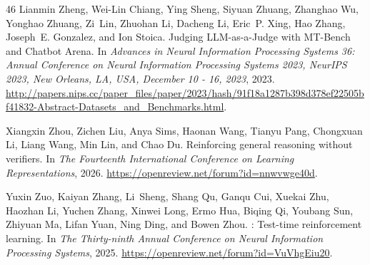 \begin{thebibliography}{46}
Lianmin Zheng, Wei{-}Lin Chiang, Ying Sheng, Siyuan Zhuang, Zhanghao Wu, Yonghao Zhuang, Zi~Lin, Zhuohan Li, Dacheng Li, Eric~P. Xing, Hao Zhang, Joseph~E. Gonzalez, and Ion Stoica.
\newblock Judging {LLM-as-a-Judge} with {MT-Bench} and {Chatbot Arena}.
\newblock In \emph{Advances in Neural Information Processing Systems 36: Annual Conference on Neural Information Processing Systems 2023, NeurIPS 2023, New Orleans, LA, USA, December 10 - 16, 2023}, 2023.
\newblock \url{http://papers.nips.cc/paper\_files/paper/2023/hash/91f18a1287b398d378ef22505bf41832-Abstract-Datasets\_and\_Benchmarks.html}.

Xiangxin Zhou, Zichen Liu, Anya Sims, Haonan Wang, Tianyu Pang, Chongxuan Li, Liang Wang, Min Lin, and Chao Du.
\newblock Reinforcing general reasoning without verifiers.
\newblock In \emph{The Fourteenth International Conference on Learning Representations}, 2026.
\newblock \url{https://openreview.net/forum?id=nnwvwge40d}.

Yuxin Zuo, Kaiyan Zhang, Li~Sheng, Shang Qu, Ganqu Cui, Xuekai Zhu, Haozhan Li, Yuchen Zhang, Xinwei Long, Ermo Hua, Biqing Qi, Youbang Sun, Zhiyuan Ma, Lifan Yuan, Ning Ding, and Bowen Zhou.
: Test-time reinforcement learning.
\newblock In \emph{The Thirty-ninth Annual Conference on Neural Information Processing Systems}, 2025.
\newblock \url{https://openreview.net/forum?id=VuVhgEiu20}.

\end{thebibliography}
